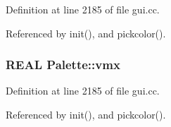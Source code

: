 Definition at line 2185 of file gui.cc.

Referenced by init(), and pickcolor().\hypertarget{namespacePalette_811f17becae697d9244ef6fcde397618}{
\subsubsection[{vmx}]{\setlength{\rightskip}{0pt plus 5cm}REAL {\bf Palette::vmx}}}
\label{namespacePalette_811f17becae697d9244ef6fcde397618}




Definition at line 2185 of file gui.cc.

Referenced by init(), and pickcolor().